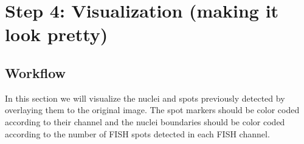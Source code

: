 \section{Step 4: Visualization (making it look pretty)}

\subsection{Workflow}
In this section we will visualize the nuclei and spots previously detected by overlaying them to the original image. The spot markers should be color coded according to their channel and the nuclei boundaries should be color coded according to the number of FISH spots detected in each FISH channel.